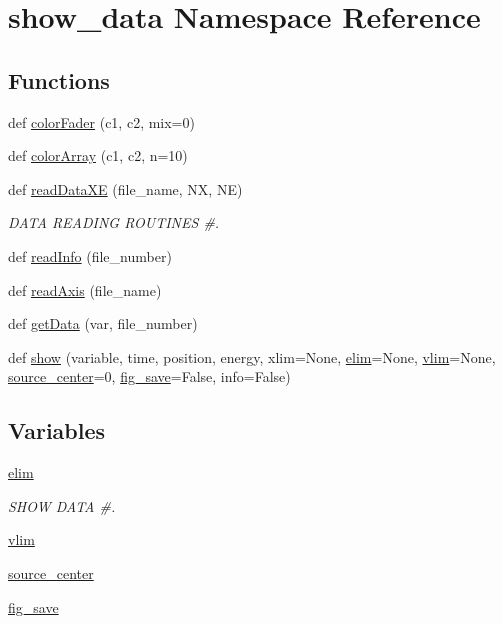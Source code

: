 \hypertarget{namespaceshow__data}{}\section{show\+\_\+data Namespace Reference}
\label{namespaceshow__data}
\subsection*{Functions}
\begin{DoxyCompactItemize}
\item 
def \hyperlink{namespaceshow__data_a873cf61b0f5e496268ec471d2213a8d0}{color\+Fader} (c1, c2, mix=0)
\item 
def \hyperlink{namespaceshow__data_af808c5113008c209a2337873011349e3}{color\+Array} (c1, c2, n=10)
\item 
def \hyperlink{namespaceshow__data_ae04ae714cdb070ab5d3340f1a068c9b5}{read\+Data\+XE} (file\+\_\+name, NX, NE)
\begin{DoxyCompactList}\small\item\em D\+A\+TA R\+E\+A\+D\+I\+NG R\+O\+U\+T\+I\+N\+ES \#. \end{DoxyCompactList}\item 
def \hyperlink{namespaceshow__data_aab5be823cbbc61ae5b19de227cc9ed56}{read\+Info} (file\+\_\+number)
\item 
def \hyperlink{namespaceshow__data_ab1b09a72c8a889095ad5231f164de37b}{read\+Axis} (file\+\_\+name)
\item 
def \hyperlink{namespaceshow__data_a2c2fe221957ed1df5ec9cac78fa84c63}{get\+Data} (var, file\+\_\+number)
\item 
def \hyperlink{namespaceshow__data_a721e32af0ead3a2589ece3597f8af588}{show} (variable, time, position, energy, xlim=None, \hyperlink{namespaceshow__data_a4a13158954bd6cb505cff7ce9a044bad}{elim}=None, \hyperlink{namespaceshow__data_adf1ce8932109c52c2fb1fdd332428040}{vlim}=None, \hyperlink{namespaceshow__data_ae40a00cb6249f5f77e6f8bf3d0622519}{source\+\_\+center}=0, \hyperlink{namespaceshow__data_a87ba16bdf51b27121c97f78ccf6f2d74}{fig\+\_\+save}=False, info=False)
\end{DoxyCompactItemize}
\subsection*{Variables}
\begin{DoxyCompactItemize}
\item 
\hyperlink{namespaceshow__data_a4a13158954bd6cb505cff7ce9a044bad}{elim}
\begin{DoxyCompactList}\small\item\em S\+H\+OW D\+A\+TA \#. \end{DoxyCompactList}\item 
\hyperlink{namespaceshow__data_adf1ce8932109c52c2fb1fdd332428040}{vlim}
\item 
\hyperlink{namespaceshow__data_ae40a00cb6249f5f77e6f8bf3d0622519}{source\+\_\+center}
\item 
\hyperlink{namespaceshow__data_a87ba16bdf51b27121c97f78ccf6f2d74}{fig\+\_\+save}
\end{DoxyCompactItemize}


